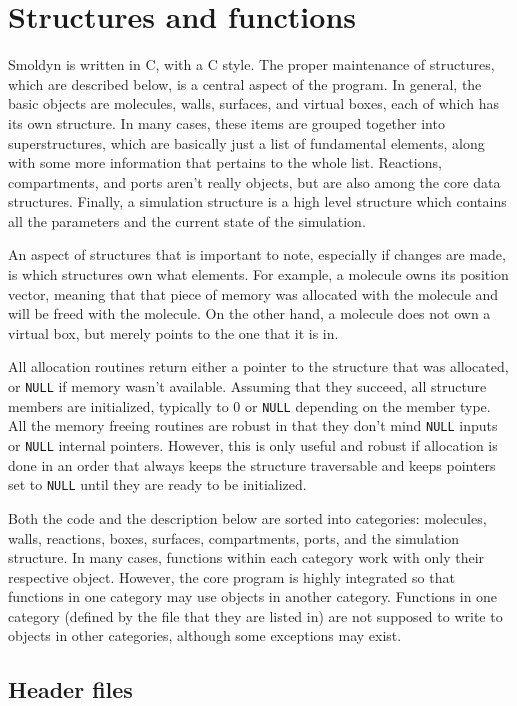\documentclass {book}
\begin{document}
\chapter{Structures and functions}

Smoldyn is written in C, with a C style. The proper maintenance of structures, which are described below, is a central aspect of the program. In general, the basic objects are molecules, walls, surfaces, and virtual boxes, each of which has its own structure. In many cases, these items are grouped together into superstructures, which are basically just a list of fundamental elements, along with some more information that pertains to the whole list. Reactions, compartments, and ports aren't really objects, but are also among the core data structures. Finally, a simulation structure is a high level structure which contains all the parameters and the current state of the simulation.

An aspect of structures that is important to note, especially if changes are made, is which structures own what elements. For example, a molecule owns its position vector, meaning that that piece of memory was allocated with the molecule and will be freed with the molecule. On the other hand, a molecule does not own a virtual box, but merely points to the one that it is in.

All allocation routines return either a pointer to the structure that was allocated, or \texttt{NULL} if memory wasn't available. Assuming that they succeed, all structure members are initialized, typically to 0 or \texttt{NULL} depending on the member type. All the memory freeing routines are robust in that they don't mind \texttt{NULL} inputs or \texttt{NULL} internal pointers. However, this is only useful and robust if allocation is done in an order that always keeps the structure traversable and keeps pointers set to \texttt{NULL} until they are ready to be initialized.

Both the code and the description below are sorted into categories: molecules, walls, reactions, boxes, surfaces, compartments, ports, and the simulation structure. In many cases, functions within each category work with only their respective object. However, the core program is highly integrated so that functions in one category may use objects in another category. Functions in one category (defined by the file that they are listed in) are not supposed to write to objects in other categories, although some exceptions may exist.

\section{Header files}
\end{document}
